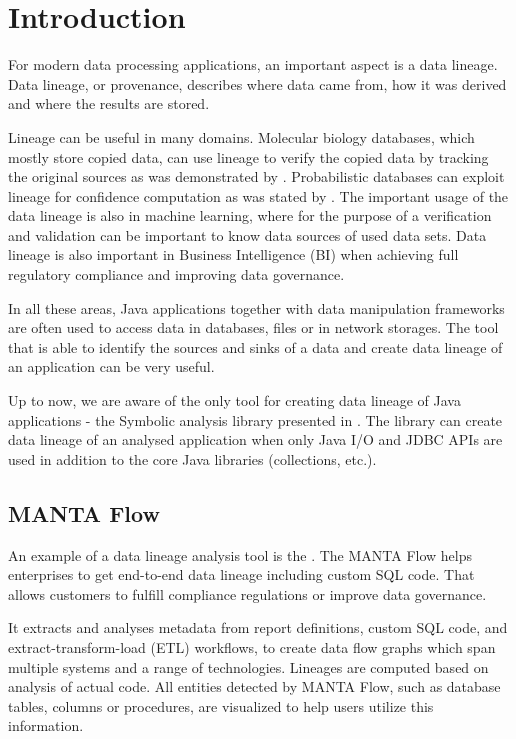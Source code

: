 
\chapter{Introduction}

For modern data processing applications, an important aspect
is a data lineage.
Data lineage, or provenance, describes where data came from,
how it was derived and where the results are stored.

Lineage can be useful in many domains.
Molecular biology databases, which mostly store copied data,
can use lineage to verify the copied data by tracking the original
sources as was demonstrated by \citet{DataLineageInBioInformatics}.
Probabilistic databases can exploit lineage for confidence
computation as was stated by \citet{DataLineageInProbabilisticDatabases}.
The important usage of the data lineage is also in machine learning,
where for the purpose of a verification and validation can be important
to know data sources of used data sets.
Data lineage is also important in Business Intelligence (BI)
when achieving full regulatory compliance and improving data governance.

In all these areas, Java applications together with data manipulation frameworks
are often used to access data in databases, files or in network storages.
The tool that is able to identify the sources and sinks of a data
and create data lineage of an application can be very useful.

Up to now, we are aware of the only tool for creating data lineage of
Java applications - the Symbolic analysis library
presented in \citet{ParizekHybridAnalysis}.
The library can create data lineage of an analysed application when only
Java I/O and JDBC APIs are used in addition to the core
Java libraries (collections, etc.).



\section{MANTA Flow}

An example of a data lineage analysis tool is the \citet{MantaFlow}.
The MANTA Flow helps enterprises to get end-to-end
data lineage including custom SQL code. That allows customers to fulfill
compliance regulations or improve data governance.

It extracts and analyses metadata from report definitions,
custom SQL code, and extract-transform-load (ETL) workflows, to create data flow graphs
which span multiple systems and a range of technologies.
Lineages are computed based on analysis of actual code.
All entities detected by MANTA Flow, such as database tables, columns or procedures,
are visualized to help users utilize this information.

